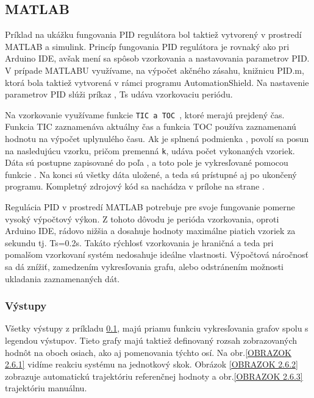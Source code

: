 \subsection{MATLAB}
\label{MATLABPID}

Príklad na ukážku fungovania PID regulátora bol taktiež vytvorený v prostredí MATLAB a simulink. Princíp fungovania PID regulátora je rovnaký ako pri Arduino IDE, avšak mení sa spôsob vzorkovania a nastavovania parametrov PID. V prípade MATLABU využívame, na výpočet akčného zásahu, knižnicu PID.m, ktorá bola taktiež vytvorená v rámci programu AutomationShield. Na nastavenie parametrov PID slúži príkaz , Ts udáva vzorkovaciu periódu. 

Na vzorkovanie využívame funkcie \verb|TIC a TOC |, ktoré merajú prejdený čas. Funkcia TIC zaznamenáva aktuálny čas a funkcia TOC používa zaznamenanú hodnotu na výpočet uplynulého času. Ak je splnená podmienka , povolí sa posun na nasledujúcu vzorku, pričom premenná \verb*|k|, udáva počet vykonaných vzoriek. Dáta sú postupne zapisované do poľa , a toto pole je vykresľované pomocou funkcie . Na konci sú všetky dáta uložené, a teda sú prístupné aj po ukončený programu. Kompletný zdrojový kód sa nachádza v prílohe na strane \pageref{AeroShieldPID.m}.

Regulácia PID v prostredí MATLAB potrebuje pre svoje fungovanie pomerne vysoký výpočtový výkon. Z tohoto dôvodu je perióda vzorkovania, oproti Arduino IDE, rádovo nižšia a dosahuje hodnoty maximálne piatich vzoriek za sekundu tj. Ts=0.2s. Takáto rýchlosť vzorkovania je hraničná a teda pri pomalšom vzorkovaní systém nedosahuje ideálne vlastnosti. Výpočtová náročnosť sa dá znížiť, zamedzením vykresľovania grafu, alebo odstránením možnosti ukladania zaznamenaných dát. 

\newpage
\subsubsection{Výstupy}

Všetky výstupy z príkladu \ref{MATLABPID}, majú priamu funkciu vykresľovania grafov spolu s legendou výstupov. Tieto grafy majú taktiež definovaný rozsah zobrazovaných hodnôt na oboch osiach, ako aj pomenovania týchto osí. Na obr.\ref{OBRAZOK 2.6.1} vidíme reakciu systému na jednotkový skok. Obrázok \ref{OBRAZOK 2.6.2} zobrazuje automatickú trajektóriu referenčnej hodnoty a obr.\ref{OBRAZOK 2.6.3} trajektóriu manuálnu. 

